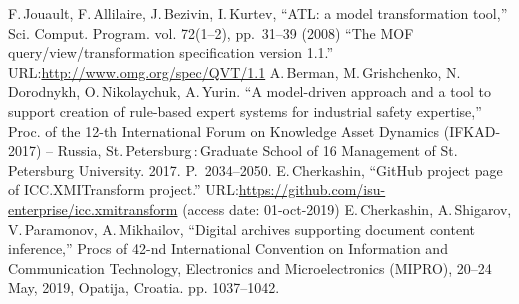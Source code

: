 \documentclass[conference]{IEEEtran} \IEEEoverridecommandlockouts
\begin{document}
\begin{thebibliography}{99}
 F.\,Jouault, F.\,Allilaire, J.\,Bezivin, I.\,Kurtev, ``ATL: a model transformation tool,'' Sci. Comput. Program. vol. 72(1--2), pp.~31--39 (2008)  ``The MOF query/view/transformation specification version 1.1.'' URL:\url{http://www.omg.org/spec/QVT/1.1}  A.\,Berman, M.\,Grishchenko, N.\,Dorodnykh, O.\,Nikolaychuk, A.\,Yurin. ``A model-driven approach and a tool to support creation of rule-based expert systems for industrial safety expertise,'' Proc. of the 12-th International Forum on Knowledge Asset Dynamics (IFKAD-2017) -- Russia, St.\,Petersburg\,:\,Graduate School of 16 Management of St.\,Petersburg University. 2017. P.~2034--2050.  E.\,Cherkashin, ``GitHub project page of ICC.XMITransform project.'' URL:\url{https://github.com/isu-enterprise/icc.xmitransform} (access date: 01-oct-2019)  E.\,Cherkashin, A.\,Shigarov, V.\,Paramonov, A.\,Mikhailov, ``Digital archives supporting document content inference,'' Procs of 42-nd International Convention on Information and Communication Technology, Electronics and Microelectronics (MIPRO), 20--24 May, 2019, Opatija, Croatia. pp. 1037--1042. 


\end{thebibliography}
\end{document}
